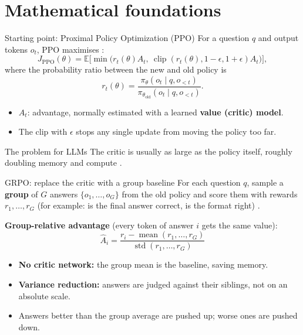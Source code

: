 \documentclass[xcolor=svgnames]{beamer}
\begin{document}
\section{Mathematical foundations}
\begin{frame}{Starting point: Proximal Policy Optimization (PPO)}
For a question $q$ and output tokens $o_t$, PPO maximises \cite{schulman2017ppo}:
\[
J_{\text{PPO}}(\theta) = \mathbb{E}\Big[\min\big(r_t(\theta) A_t,\ \operatorname{clip}(r_t(\theta), 1-\epsilon, 1+\epsilon) A_t\big)\Big],
\]
where the probability ratio between the new and old policy is
\[
r_t(\theta)=\frac{\pi_\theta(o_t \mid q, o_{<t})}{\pi_{\theta_{\text{old}}}(o_t \mid q, o_{<t})}.
\]
\begin{itemize}
  \item $A_t$: advantage, normally estimated with a learned \textbf{value (critic) model}.
  \item The clip with $\epsilon$ stops any single update from moving the policy too far.
\end{itemize}
\begin{alertblock}{The problem for LLMs}
The critic is usually as large as the policy itself, roughly doubling memory and compute \cite{shao2024deepseekmath}.
\end{alertblock}
\end{frame}

\begin{frame}{GRPO: replace the critic with a group baseline}
For each question $q$, sample a \textbf{group} of $G$ answers $\{o_1,\dots,o_G\}$ from the old policy and score them with rewards $r_1,\dots,r_G$ (for example: is the final answer correct, is the format right) \cite{shao2024deepseekmath,guo2025deepseekr1}.

\vspace{0.2cm}
\textbf{Group-relative advantage} (every token of answer $i$ gets the same value):
\[
\hat{A}_{i} = \frac{r_i - \operatorname{mean}(r_1,\dots,r_G)}{\operatorname{std}(r_1,\dots,r_G)}
\]
\begin{itemize}
  \item \textbf{No critic network:} the group mean is the baseline, saving memory.
  \item \textbf{Variance reduction:} answers are judged against their siblings, not on an absolute scale.
  \item Answers better than the group average are pushed up; worse ones are pushed down.
\end{itemize}
\end{frame}
\end{document}
